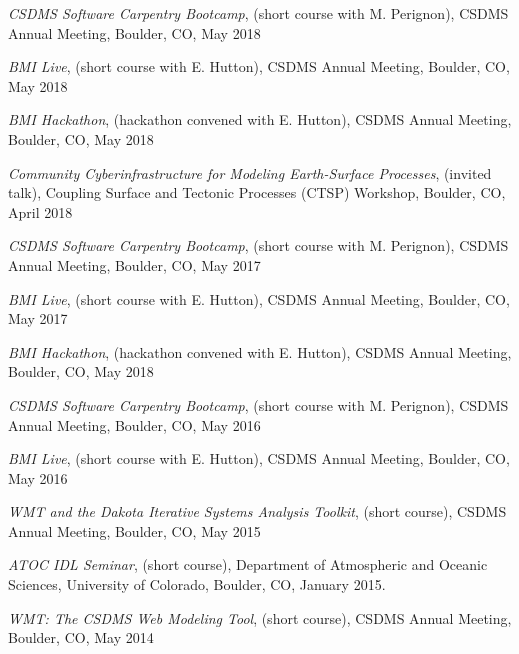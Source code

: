 \documentclass[letterpaper]{resume}
\begin{document}
\begin{enumerate}[{[}1{]}]

  \item \textit{CSDMS Software Carpentry Bootcamp}, (short course with
    M. Perignon), CSDMS Annual Meeting, Boulder, CO, May 2018

  \item \textit{BMI Live}, (short course with E. Hutton),
    CSDMS Annual Meeting, Boulder, CO, May 2018

  \item \textit{BMI Hackathon}, (hackathon convened with E. Hutton),
    CSDMS Annual Meeting, Boulder, CO, May 2018

  \item \textit{Community Cyberinfrastructure for Modeling
    Earth-Surface Processes}, (invited talk), Coupling Surface and
    Tectonic Processes (CTSP) Workshop, Boulder, CO, April 2018

  \item \textit{CSDMS Software Carpentry Bootcamp}, (short course with
    M. Perignon), CSDMS Annual Meeting, Boulder, CO, May 2017

  \item \textit{BMI Live}, (short course with E. Hutton),
    CSDMS Annual Meeting, Boulder, CO, May 2017

  \item \textit{BMI Hackathon}, (hackathon convened with E. Hutton),
    CSDMS Annual Meeting, Boulder, CO, May 2018

  \item \textit{CSDMS Software Carpentry Bootcamp}, (short course with
    M. Perignon), CSDMS Annual Meeting, Boulder, CO, May 2016

  \item \textit{BMI Live}, (short course with E. Hutton),
    CSDMS Annual Meeting, Boulder, CO, May 2016

  \item \textit{WMT and the Dakota Iterative Systems Analysis Toolkit},
    (short course), CSDMS Annual Meeting, Boulder, CO, May 2015

  \item \textit{ATOC IDL Seminar}, (short course), Department of
    Atmospheric and Oceanic Sciences, University of Colorado, Boulder,
    CO, January 2015.

  \item \textit{WMT: The CSDMS Web Modeling Tool}, (short course), CSDMS
    Annual Meeting, Boulder, CO, May 2014


\end{enumerate}
\end{document}
